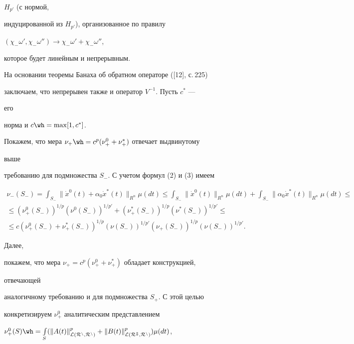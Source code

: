 $H_{p'}$ (с нормой, 


индуцированной из $H_{p'}$), организованное по правилу 


$(\chi_-\omega',\chi_-\omega'')\to\chi_-\omega'+\chi_-\omega''$, 


которое будет линейным и непрерывным. 


На основании теоремы Банаха об обратном операторе ([12], с.\,225) 


заключаем, что непрерывен также и оператор $V^{-1}$. Пусть $c^*$ --- 


его 


норма и $c\wh =\max[1,c^*]$. 


 


Покажем, что мера $\nu_+\wh =c^p(\nu^0_++\nu^*_+)$ отвечает выдвинутому 


выше 


требованию для подмножества $S_-$. С учетом формул (2) и (3) имеем 


\begin{multline*} 


\nu_-(S_-)=\int_{S_-}\|\Dot x^0(t)+\alpha_0\Dot x^*(t)\|_{R^n} 


\mu(dt)\le\int_{S_-}\|\Dot x^0(t)\|_{R^n}\mu(dt)+ 


\int_{S_-}\|\alpha_0\Dot x^*(t)\|_{R^n}\mu(dt)\le \\ 


% 


\le(\nu^0_+(S_-))^{1/p}(\nu^0(S_-))^{1/p'}+ 


(\nu^*_+(S_-))^{1/p}(\nu^*(S_-))^{1/p'}\le \\


%


\le c(\nu^0_+(S_-)+\nu^*_+(S_-))^{1/p} 


(\nu(S_-))^{1/p'}(\nu_+(S_-))^{1/p}(\nu(S_-))^{1/p'}. 


\end{multline*} 


Далее, 


покажем, что мера $\nu_+=c^p(\nu^0_++\nu^*_+)$ обладает конструкцией, 


отвечающей 


аналогичному требованию и для подмножества $S_+$. С этой целью 


конкретизируем $\nu^0_+$ аналитическим представлением 


$\nu^0_+(S)\wh=\int\limits_S(\|A(t)\|^p_{\cal L(R^n,R^n)}+ 


\|B(t)\|^p_{\cal L(R^m,R^n)})\mu(dt)$, 



